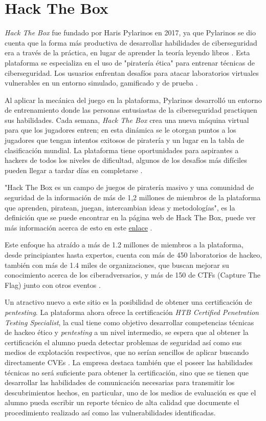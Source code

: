 \documentclass{article}
\begin{document}
    \section{Hack The Box}
            
        \emph{Hack The Box} fue fundado por Haris Pylarinos en 2017, ya que Pylarinos se dio cuenta que la forma más productiva de desarrollar habilidades de ciberseguridad era a través de la práctica, en lugar de aprender la teoría leyendo libros \cite{novick_2019}. Esta plataforma se especializa en el uso de "piratería ética" para entrenar técnicas de ciberseguridad. Los usuarios enfrentan desafíos para atacar laboratorios virtuales vulnerables en un entorno simulado, gamificado y de prueba \cite{butcher_2021}.
        
        Al aplicar la mecánica del juego en la plataforma, Pylarinos desarrolló un entorno de entrenamiento donde las personas entusiastas de la ciberseguridad practiquen sus habilidades. Cada semana, \emph{Hack The Box} crea una nueva máquina virtual para que los jugadores entren; en esta dinámica se le otorgan puntos a los jugadores que tengan intentos exitosos de piratería y un lugar en la tabla de clasificación mundial. La plataforma tiene oportunidades para aspirantes a hackers de todos los niveles de dificultad, algunos de los desafíos más difíciles pueden llegar a tardar días en completarse \cite{novick_2019}.
        
        "Hack The Box es un campo de juegos de piratería masivo y una comunidad de seguridad de la información de más de 1,2 millones de miembros de la plataforma que aprenden, piratean, juegan, intercambian ideas y metodologías", es la definición que se puede encontrar en la página web de Hack The Box, puede ver más información acerca de esto en este \href{https://www.hackthebox.com/about-us}{enlace} \cite{hack}.
        
        Este enfoque ha atraído a más de 1.2 millones de miembros a la plataforma, desde principiantes hasta expertos, cuenta con más de 450 laboratorios de hackeo, también con más de 1.4 miles de organizaciones, que buscan mejorar su conocimiento acerca de los ciberadversarios, y más de 150 de CTFs (Capture The Flag) junto con otros eventos \cite{hack}.

        Un atractivo nuevo a este sitio es la posibilidad de obtener una certificación de \emph{pentesting}. La plataforma ahora ofrece la certificación \emph{HTB Certified Penetration Testing Specialist}, la cual tiene como objetivo desarrollar competencias técnicas de hackeo ético y \emph{pentesting} a un nivel intermedio, se espera que al obtener la certificación el alumno pueda detectar problemas de seguridad así como sus medios de explotación respectivos, que no serían sencillos de aplicar buscando directamente CVEs \cite{htb-cert-info}. La empresa destaca también que el poseer las habilidades técnicas no será suficiente para obtener la certificación, sino que se tienen que desarrollar las habilidades de comunicación necesarias para transmitir los descubrimientos hechos, en particular, uno de los medios de evaluación es que el alumno pueda escribir un reporte técnico de alta calidad que documente el procedimiento realizado así como las vulnerabilidades identificadas.
        
\end{document}
